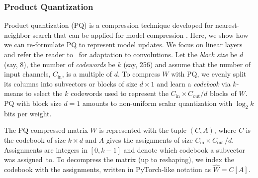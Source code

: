 \documentclass[11pt]{article}
\newcommand{\cin}{C_{\text{in}}}
\newcommand{\cout}{C_{\text{out}}}
\begin{document}
\subsubsection{Product Quantization}
\label{subsec:pq}


Product quantization (PQ) is a compression technique developed for nearest-neighbor search \cite{Graham-jegou2011product} that can be applied for model compression \cite{Graham-stock2019bit}.
Here, we show how we can re-formulate PQ to represent model updates.
We focus on linear layers and refer the reader to~\cite{Graham-stock2019bit} for adaptation to convolutions.
Let the \emph{block size} be $d$ (say, 8), the number of \emph{codewords} be $k$ (say, 256) and assume that the number of input channels, $\cin$, is a multiple of $d$.
To compress $W$ with PQ, we evenly split its columns into subvectors or blocks of size $d \times 1$ and learn a \emph{codebook} via $k$-means to select the $k$ codewords used to represent the $\cin\times\cout/d$ blocks of $W$. PQ with block size $d=1$ amounts to non-uniform scalar quantization with $\log_2 k$ bits per weight.

The PQ-compressed matrix $W$ is represented with the tuple $(C, A)$, where $C$ is the codebook of size $k \times d$ and $A$ gives the assignments of size $\cin \times\cout / d$.
Assignments are integers in $[0, k-1]$ and denote which codebook a subvector was assigned~to.
To decompress the matrix (up to reshaping), we index the codebook with the assignments, written in PyTorch-like notation as
$
    \widehat {W} = C[A].
$
\end{document}

